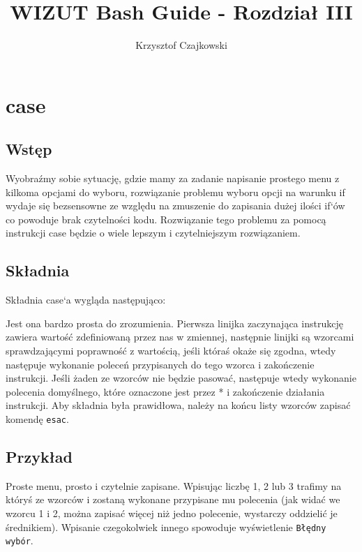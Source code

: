 \documentclass[10 pt, a4paper, draft]{article}
\author{Krzysztof Czajkowski}
\title{WIZUT Bash Guide - Rozdział III}
\begin{document}
\maketitle
\tableofcontents
\newpage


\section{case}
\subsection{Wstęp}
Wyobraźmy sobie sytuację, gdzie mamy za zadanie napisanie prostego menu z kilkoma
opcjami do wyboru, rozwiązanie problemu wyboru opcji na warunku if wydaje się
bezsensowne ze względu na zmuszenie do zapisania dużej ilości if`ów co powoduje brak
czytelności kodu. Rozwiązanie tego problemu za pomocą instrukcji case będzie o wiele
lepszym i czytelniejszym rozwiązaniem.

\subsection{Składnia}
Składnia case`a wygląda następująco:



Jest ona bardzo prosta do zrozumienia. Pierwsza linijka zaczynająca instrukcję zawiera
wartość zdefiniowaną przez nas w zmiennej, następnie linijki są wzorcami sprawdzającymi
poprawność z wartością, jeśli któraś okaże się zgodna, wtedy następuje wykonanie poleceń
przypisanych do tego wzorca i zakończenie instrukcji. Jeśli żaden ze wzorców nie będzie
pasować, następuje wtedy wykonanie polecenia domyślnego, które oznaczone jest przez * i
zakończenie działania instrukcji. Aby składnia była prawidłowa, należy na końcu listy
wzorców zapisać komendę \texttt{esac}.

\subsection{Przykład} 



Proste menu, prosto i czytelnie zapisane. Wpisując liczbę 1, 2 lub 3 trafimy na któryś ze
wzorców i zostaną wykonane przypisane mu polecenia (jak widać we wzorcu 1 i 2, można
zapisać więcej niż jedno polecenie, wystarczy oddzielić je średnikiem). Wpisanie
czegokolwiek innego spowoduje wyświetlenie \texttt{Błędny wybór}.
\newline
\end{document}
